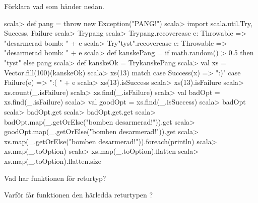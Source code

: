 \Subtask Förklara vad som händer nedan.
\begin{REPL}
scala> def pang = throw new Exception("PANG!")
scala> import scala.util.{Try, Success, Failure}
scala> Try{pang}
scala> Try{pang}.recover{case e: Throwable =>   "desarmerad bomb: " + e}
scala> Try{"tyst"}.recover{case e: Throwable => "desarmerad bomb: " + e}
scala> def kanskePang = if math.random() > 0.5 then "tyst" else pang
scala> def kanskeOk = Try{kanskePang}
scala> val xs = Vector.fill(100)(kanskeOk)
scala> xs(13) match
         case Success(x) => ":)"
         case Failure(e) => ":( " + e
scala> xs(13).isSuccess
scala> xs(13).isFailure
scala> xs.count(_.isFailure)
scala> xs.find(_.isFailure)
scala> val badOpt = xs.find(_.isFailure)
scala> val goodOpt = xs.find(_.isSuccess)
scala> badOpt
scala> badOpt.get
scala> badOpt.get.get
scala> badOpt.map(_.getOrElse("bomben desarmerad!")).get
scala> goodOpt.map(_.getOrElse("bomben desarmerad!")).get
scala> xs.map(_.getOrElse("bomben desarmerad!")).foreach(println)
scala> xs.map(_.toOption)
scala> xs.map(_.toOption).flatten
scala> xs.map(_.toOption).flatten.size
\end{REPL}


\Subtask Vad har funktionen  för returtyp?

\Subtask Varför får funktionen  den härledda returtypen ?

\SOLUTION


\TaskSolved \what


